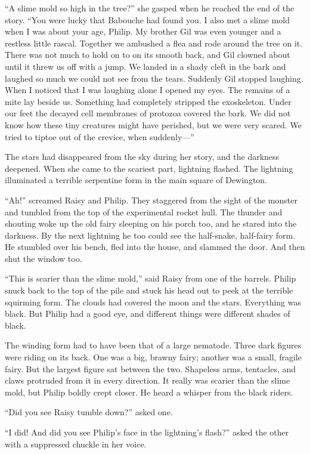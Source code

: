 \documentclass[10pt]{memoir}
\begin{document}
``A slime mold so high in the tree?'' she gasped when he reached the end of the
story. ``You were lucky that Babouche had found you. I also met a slime mold
when I was about your age, Philip. My brother Gil was even younger and a
restless little rascal. Together we ambushed a flea and rode around the tree on
it. There was not much to hold on to on its smooth back, and Gil clowned about
until it threw us off with a jump. We landed in a shady cleft in the bark and
laughed so much we could not see from the tears. Suddenly Gil stopped laughing.
When I noticed that I was laughing alone I opened my eyes. The remains of a
mite lay beside us. Something had completely stripped the exoskeleton. Under
our feet the decayed cell membranes of protozoa covered the bark. We did not
know how these tiny creatures might have perished, but we were very scared. We
tried to tiptoe out of the crevice, when suddenly---''

The stars had disappeared from the sky during her story, and the darkness
deepened. When she came to the scariest part, lightning flashed. The lightning
illuminated a terrible serpentine form in the main square of Dewington.

``Ah!'' screamed Raisy and Philip. They staggered from the sight of the monster
and tumbled from the top of the experimental rocket hull. The thunder and
shouting woke up the old fairy sleeping on his porch too, and he stared into
the darkness. By the next lightning he too could see the half-snake, half-fairy
form. He stumbled over his bench, fled into the house, and slammed the door.
And then shut the window too.

``This is scarier than the slime mold,'' said Raisy from one of the barrels.
Philip snuck back to the top of the pile and stuck his head out to peek at the
terrible squirming form. The clouds had covered the moon and the stars.
Everything was black. But Philip had a good eye, and different things were
different shades of black.

The winding form had to have been that of a large nematode. Three dark figures
were riding on its back. One was a big, brawny fairy; another was a small,
fragile fairy. But the largest figure sat between the two. Shapeless arms,
tentacles, and claws protruded from it in every direction. It really was scarier
than the slime mold, but Philip boldly crept closer. He heard a whisper from
the black riders.

``Did you see Raisy tumble down?'' asked one.

``I did! And did you see Philip's face in the lightning's flash?'' asked the
other with a suppressed chuckle in her voice.
\end{document}
